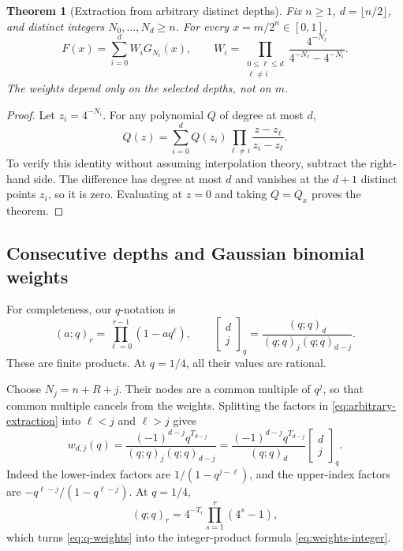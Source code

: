 \documentclass[11pt,a4paper]{article}
\numberwithin{equation}{section}
\newtheorem{theorem}{Theorem}[section]
\theoremstyle{definition}
\theoremstyle{remark}
\newcommand{\qbinom}[3]{\begin{bmatrix}#1\\#2\end{bmatrix}_{#3}}
\begin{document}
\begin{theorem}[Extraction from arbitrary distinct depths]
\label{thm:arbitrary-depths}
Fix $n\ge1$, $d=\lfloor n/2\rfloor$, and distinct integers $N_0,\ldots,N_d\ge n$. For every $x=m/2^n\in[0,1]$,
\begin{equation}
 F(x)=\sum_{i=0}^{d}W_iG_{N_i}(x),\qquad
 W_i=\prod_{\substack{0\le\ell\le d\\\ell\ne i}}
       \frac{4^{-N_\ell}}{4^{-N_\ell}-4^{-N_i}}.
 \label{eq:arbitrary-extraction}
\end{equation}
The weights depend only on the selected depths, not on $m$.
\end{theorem}
\begin{proof}
Let $z_i=4^{-N_i}$. For any polynomial $Q$ of degree at most $d$,
\[
 Q(z)=\sum_{i=0}^{d}Q(z_i)
       \prod_{\ell\ne i}\frac{z-z_\ell}{z_i-z_\ell}.
\]
To verify this identity without assuming interpolation theory, subtract the right-hand side. The difference has degree at most $d$ and vanishes at the $d+1$ distinct points $z_i$, so it is zero. Evaluating at $z=0$ and taking $Q=Q_x$ proves the theorem.
\end{proof}

\subsection{Consecutive depths and Gaussian binomial weights}
For completeness, our $q$-notation is
\begin{equation}
 (a;q)_r=\prod_{\ell=0}^{r-1}(1-aq^\ell),\qquad
 \qbinom{d}{j}{q}=\frac{(q;q)_d}{(q;q)_j(q;q)_{d-j}}.
 \label{eq:q-definitions}
\end{equation}
These are finite products. At $q=1/4$, all their values are rational.

Choose $N_j=n+R+j$. Their nodes are a common multiple of $q^j$, so that common multiple cancels from the weights. Splitting the factors in \cref{eq:arbitrary-extraction} into $\ell<j$ and $\ell>j$ gives
\begin{equation}
 \boxed{\displaystyle
 w_{d,j}(q)=
 \frac{(-1)^{d-j}q^{T_{d-j}}}{(q;q)_j(q;q)_{d-j}}
 =\frac{(-1)^{d-j}q^{T_{d-j}}}{(q;q)_d}
       \qbinom{d}{j}{q}.}
 \label{eq:q-weights}
\end{equation}
Indeed the lower-index factors are $1/(1-q^{j-\ell})$, and the upper-index factors are $-q^{\ell-j}/(1-q^{\ell-j})$. At $q=1/4$,
\[
 (q;q)_r=4^{-T_r}\prod_{s=1}^{r}(4^s-1),
\]
which turns \cref{eq:q-weights} into the integer-product formula \cref{eq:weights-integer}.
\end{document}
